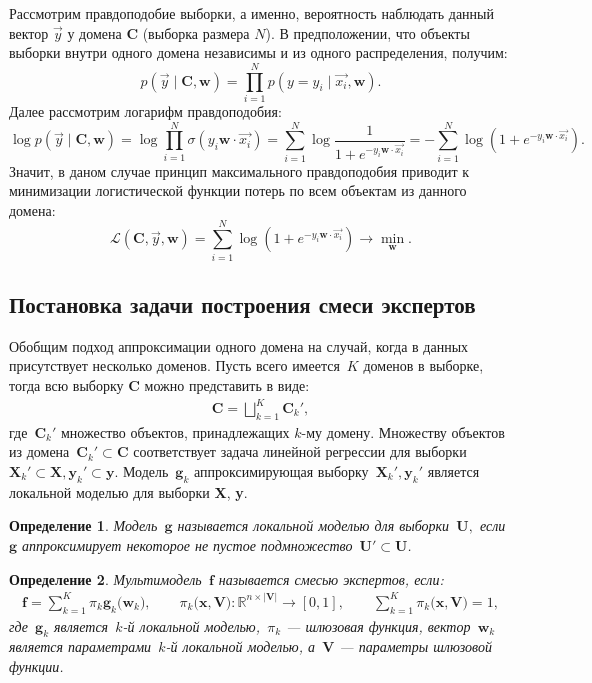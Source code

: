 \documentclass[12pt, twoside]{article}
\newtheorem{definition}{Определение}
\begin{document}
Рассмотрим правдоподобие выборки, а именно, вероятность наблюдать данный вектор $\vec{y}$ у домена $\textbf{C}$ (выборка размера $N$). В предположении, что объекты выборки внутри одного домена независимы и из одного распределения, получим:
\[p \left(\vec{y} \mid \textbf{C}, \mathbf{w}\right) = \prod_{i=1}^{N} p\left(y = y_i \mid \vec{x_i}, \mathbf{w}\right).\]
Далее рассмотрим логарифм правдоподобия:
\[\log p\left(\vec{y} \mid \textbf{C}, \mathbf{w}\right) = \log \prod_{i=1}^{N} \sigma(y_i \mathbf{w} \cdot \vec{x_i}) = \sum_{i=1}^{N} \log \frac{1}{1 + e^{-y_i \mathbf{w} \cdot \vec{x_i}}} = - \sum_{i=1}^{N} \log (1 + e^{-y_i \mathbf{w} \cdot \vec{x_i}}).\]
Значит, в даном случае принцип максимального правдоподобия приводит к минимизации логистической функции потерь по всем объектам из данного домена:
\[\mathcal{L} (\textbf{C}, \vec{y}, \mathbf{w}) = \sum_{i=1}^{N} \log (1 + e^{-y_i \mathbf{w} \cdot \vec{x_i}}) \to \min_{\mathbf{w}}.\]



\subsection{Постановка задачи построения смеси экспертов}
Обобщим подход аппроксимации одного домена на случай, когда в данных присутствует несколько доменов. Пусть всего имеется~$K$ доменов в выборке, тогда всю выборку $\textbf{C}$ можно представить в виде:
\[
\label{eq:st:1}
\begin{aligned}
\textbf{C} = \bigsqcup \limits_{k=1}^{K}\textbf{C}_{k}',
\end{aligned}
\]
где~$\textbf{C}_{k}'$ множество объектов, принадлежащих $k$-му домену. Множеству объектов из домена~$\textbf{C}_{k}' \subset\textbf{C}$ соответствует задача линейной регрессии для выборки~$\textbf{X}_{k}' \subset \textbf{X}, \textbf{y}_{k}' \subset \textbf{y}$. Модель~$\mathbf{g}_k$ аппроксимирующая выборку~$\textbf{X}_{k}', \textbf{y}_{k}'$ является локальной моделью для выборки \textbf{X}, \textbf{y}.


\begin{definition}
\label{def:1}
Модель~$\mathbf{g}$ называется локальной моделью для выборки~$\textbf{U},$ если~$\mathbf{g}$ аппроксимирует некоторое не пустое подмножество~$\textbf{U}'\subset\textbf{U}$.
\end{definition}

\begin{definition}
\label{def:2}
Мультимодель~$\mathbf{f}$ называется смесью экспертов, если:
\[
\label{eq:st:2}
\begin{aligned}
\mathbf{f} = \sum_{k=1}^{K}\pi_{k}\mathbf{g}_k\bigr(\mathbf{w}_k\bigr), \qquad \pi_{k}\bigr(\mathbf{x}, \mathbf{V}\bigr):\mathbb{R}^{n\times \left|\mathbf{V}\right|} \to [0, 1], \qquad \sum_{k=1}^{K}\pi_{k}\bigr(\mathbf{x}, \mathbf{V}\bigr) = 1,
\end{aligned}
\]
где~$\mathbf{g}_k$ является~$k$-й локальной моделью,~$\pi_k$ --- шлюзовая функция, вектор~$\mathbf{w}_k$ является параметрами~$k$-й локальной моделью, а~$\mathbf{V}$ --- параметры шлюзовой функции.
\end{definition}
\end{document}
